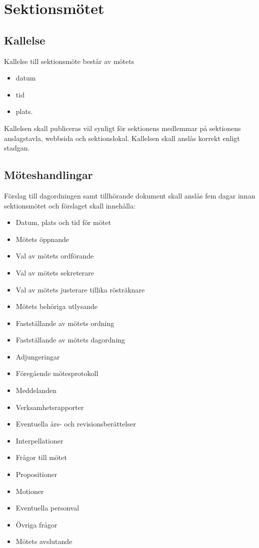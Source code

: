 \section{Sektionsmötet}

\subsection{Kallelse}
Kallelse till sektionsmöte består av mötets
\begin{itemize}
    \item datum
    \item tid
    \item plats.
\end{itemize}

Kallelsen skall publiceras väl synligt för sektionens medlemmar på sektionens anslagstavla, webbsida och sektionslokal. Kallelsen skall anslås korrekt enligt stadgan. 

\subsection{Möteshandlingar}
Förslag till dagordningen samt tillhörande dokument skall anslås fem dagar innan sektionsmötet och förslaget skall innehålla:

\begin{itemize}
	\item Datum, plats och tid för mötet
	\item Mötets öppnande
	\item Val av mötets ordförande
	\item Val av mötets sekreterare
	\item Val av mötets justerare tillika rösträknare
	\item Mötets behöriga utlysande
    \item Fastställande av mötets ordning
	\item Fastställande av mötets dagordning
	\item Adjungeringar
	\item Föregående mötesprotokoll
	\item Meddelanden
	\item Verksamhetsrapporter
	\item Eventuella års- och revisionsberättelser
	\item Interpellationer
    \item Frågor till mötet
    \item Propositioner
	\item Motioner
	\item Eventuella personval
	\item Övriga frågor
	\item Mötets avslutande
\end{itemize}


